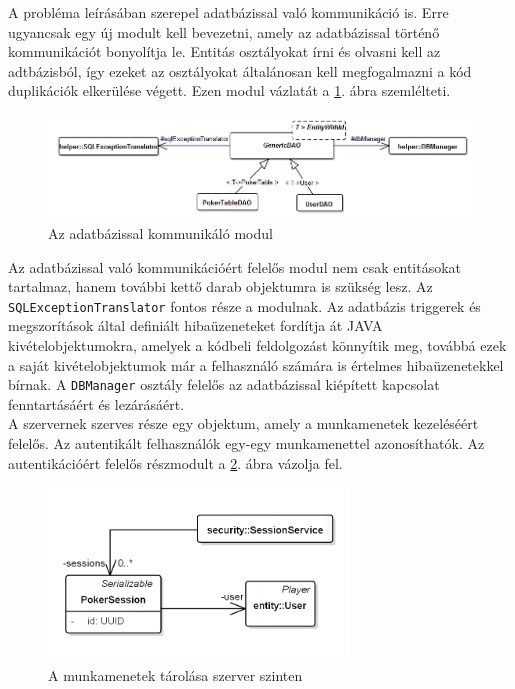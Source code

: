 A probléma leírásában szerepel adatbázissal való kommunikáció is. Erre ugyancsak egy új modult kell bevezetni, amely az adatbázissal történő kommunikációt bonyolítja le. Entitás osztályokat írni és olvasni kell az adtbázisból, így ezeket az osztályokat általánosan kell megfogalmazni a kód duplikációk elkerülése végett. Ezen modul vázlatát a \ref{fig:persist}. ábra szemlélteti. \\
\begin{figure}[h!]
	\caption{Az adatbázissal kommunikáló modul}
	\label{fig:persist}
	\centering
	\includegraphics[width=\linewidth]{developer-documentation/images/dao.png}
\end{figure}
Az adatbázissal való kommunikációért felelős modul nem csak entitásokat tartalmaz, hanem további kettő darab objektumra is szükség lesz. Az \texttt{SQLExceptionTranslator} fontos része a modulnak. Az adatbázis triggerek és megszorítások által definiált hibaüzeneteket fordítja át JAVA kivételobjektumokra, amelyek a kódbeli feldolgozást könnyítik meg, továbbá ezek a saját kivételobjektumok már a felhasználó számára is értelmes hibaüzenetekkel bírnak. A \texttt{DBManager} osztály felelős az adatbázissal kiépített kapcsolat fenntartásáért és lezárásáért. \\
A szervernek szerves része egy objektum, amely a munkamenetek kezeléséért felelős. Az autentikált felhasználók egy-egy munkamenettel azonosíthatók. Az autentikációért felelős részmodult a \ref{fig:sessionservice}. ábra vázolja fel.
\begin{figure}[h!]
	\caption{A munkamenetek tárolása szerver szinten}
	\label{fig:sessionservice}
	\centering
	\includegraphics[width=8cm]{developer-documentation/images/session.png}
\end{figure}
